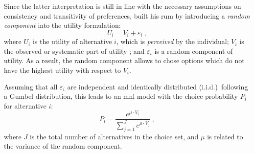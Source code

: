 

Since the latter interpretation is still in line with the necessary assumptions on consistency and transitivity of preferences, \citet{McFadden1975DiscreteChoiceModel} built his \gls{rum} by introducing a \emph{random component} into the utility formulation:
%
\begin{equation}
U_i = V_i + \varepsilon_i \ ,
\end{equation}
%
where $U_i$ is the utility of alternative $i$, which is \emph{perceived} by the individual; $V_i$ is the observed or systematic part of utility%
%
%
%
; and $\varepsilon_i$ is a random component of utility.
%
As a result, the random component allows to chose options which do not have the highest utility with respect to $V_i$.
%

Assuming that all $\varepsilon_i$ are independent and identically distributed (i.i.d.)\ following a Gumbel distribution, this leads to an \gls{mnl} model with the choice probability $P_i$ for alternative $i$:
%
\begin{equation}
P_{i} = \frac{e^{\mu \cdot V_i}}{\sum_{j=1}^{J} e^{\mu \cdot V_{j}}} \ ,
\label{eq:ch:economicEval:logit}
\end{equation}
%
%
where $J$ is the total number of alternatives in the choice set, and $\mu$ is related to the variance of the random component.%

